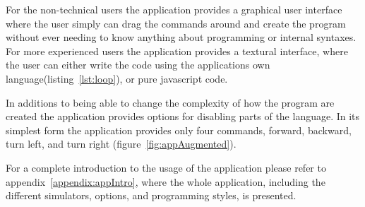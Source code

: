 \bigskip\noindent
For the non-technical users the application provides a graphical user interface where the user simply can drag the commands around and create the program without ever needing to know anything about programming or internal syntaxes. For more experienced users the application provides a textural interface, where the user can either write the code using the applications own language(listing~\ref{lst:loop}), or pure javascript code. 

\bigskip\noindent
In additions to being able to change the complexity of how the program are created the application provides options for disabling parts of the language. In its simplest form the application provides only four commands, forward, backward, turn left, and turn right (figure~\ref{fig:appAugmented}). 

\begin{figure}
	\centering
\end{figure}

\bigskip\noindent
For a complete introduction to the usage of the application please refer to appendix~\ref{appendix:appIntro}, where the whole application, including the different simulators, options, and programming styles, is presented.